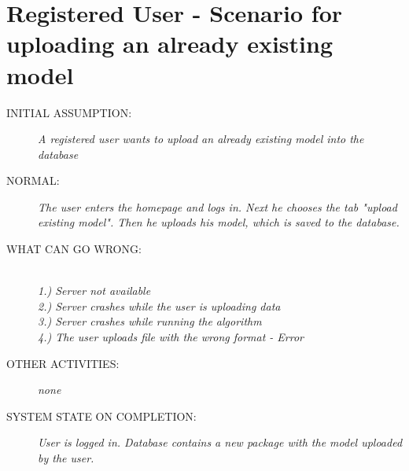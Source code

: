 \section{Registered User - Scenario for uploading an already existing model}
\begin{description}
  \item [INITIAL ASSUMPTION:]
    \textit{A registered user wants to upload an already existing model into the database}
  \item [NORMAL:]
    \textit{The user enters the homepage and logs in. Next he chooses the tab "upload existing model". Then he uploads his model, which is saved to the database.}
  \item [WHAT CAN GO WRONG:]
    \textit{\\1.) Server not available \\2.) Server crashes while the user is uploading data \\3.) Server crashes while running the algorithm \\4.) The user uploads file with the wrong format - Error
}
  \item [OTHER ACTIVITIES:]
    \textit{none}
  \item [SYSTEM STATE ON COMPLETION:]
    \textit{User is logged in. Database contains a new package with the model uploaded by the user.}
\end{description}

